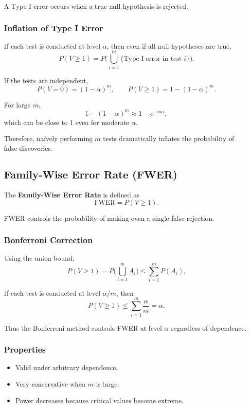 A Type I error occurs when a true null hypothesis is rejected.

\subsubsection*{Inflation of Type I Error}

If each test is conducted at level $\alpha$, then even if all null hypotheses are true,
\[
P(V \ge 1)
= P\Big( \bigcup_{i=1}^m \{\text{Type I error in test } i\} \Big).
\]

If the tests are independent,
\[
P(V = 0) = (1-\alpha)^m,
\qquad
P(V \ge 1) = 1 - (1-\alpha)^m.
\]

For large $m$,
\[
1 - (1-\alpha)^m \approx 1 - e^{-m\alpha},
\]
which can be close to 1 even for moderate $\alpha$.

Therefore, naïvely performing $m$ tests dramatically inflates the probability of false discoveries.

\subsection{Family-Wise Error Rate (FWER)}

The \textbf{Family-Wise Error Rate} is defined as
\[
\text{FWER} = P(V \ge 1).
\]

FWER controls the probability of making even a single false rejection.

\subsubsection*{Bonferroni Correction}

Using the union bound,
\[
P(V \ge 1)
= P\Big( \bigcup_{i=1}^m A_i \Big)
\le \sum_{i=1}^m P(A_i).
\]

If each test is conducted at level $\alpha/m$, then
\[
P(V \ge 1)
\le \sum_{i=1}^m \frac{\alpha}{m}
= \alpha.
\]

Thus the Bonferroni method controls FWER at level $\alpha$ regardless of dependence.

\subsubsection*{Properties}

\begin{itemize}
\item Valid under arbitrary dependence.
\item Very conservative when $m$ is large.
\item Power decreases because critical values become extreme.
\end{itemize}

